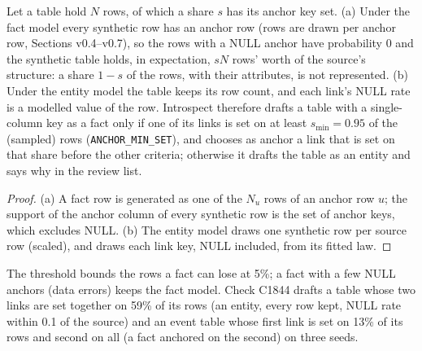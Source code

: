 \setcounter{proposition}{1843}
\begin{proposition}\label{prop:anchorset}
Let a table hold $N$ rows, of which a share $s$ has its anchor key set. (a) Under the fact model every synthetic row has an anchor row (rows are drawn per anchor row, Sections v0.4--v0.7), so the rows with a NULL anchor have probability $0$ and the synthetic table holds, in expectation, $sN$ rows' worth of the source's structure: a share $1-s$ of the rows, with their attributes, is not represented. (b) Under the entity model the table keeps its row count, and each link's NULL rate is a modelled value of the row. Introspect therefore drafts a table with a single-column key as a fact only if one of its links is set on at least $s_{\min}=0.95$ of the (sampled) rows (\texttt{ANCHOR\_MIN\_SET}), and chooses as anchor a link that is set on that share before the other criteria; otherwise it drafts the table as an entity and says why in the review list.
\end{proposition}
\begin{proof}
(a) A fact row is generated as one of the $N_u$ rows of an anchor row $u$; the support of the anchor column of every synthetic row is the set of anchor keys, which excludes NULL. (b) The entity model draws one synthetic row per source row (scaled), and draws each link key, NULL included, from its fitted law.
\end{proof}
\noindent The threshold bounds the rows a fact can lose at 5\%; a fact with a few NULL anchors (data errors) keeps the fact model. Check C1844 drafts a table whose two links are set together on 59\% of its rows (an entity, every row kept, NULL rate within 0.1 of the source) and an event table whose first link is set on 13\% of its rows and second on all (a fact anchored on the second) on three seeds.

\setcounter{proposition}{\value{savedpropdraft}}
